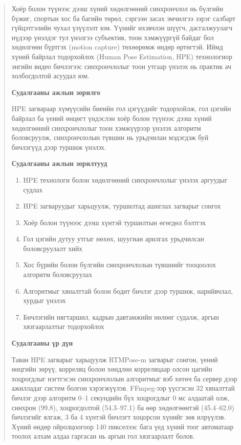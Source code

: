 \begin{abstract}
Хоёр болон түүнээс дээш хүний хөдөлгөөний синхрончлол нь бүлгийн бүжиг, спортын хос ба багийн төрөл, сэргээн засах эмчилгээ зэрэг салбарт гүйцэтгэлийн чухал үзүүлэлт юм. Үүнийг ихэвчлэн шүүгч, дасгалжуулагч нүдээр үнэлдэг тул үнэлгээ субъектив, тоон хэмжүүргүй байдаг бол хөдөлгөөн бүртгэх (motion capture) төхөөрөмж өндөр өртөгтэй. Иймд хүний байрлал тодорхойлох (Human Pose Estimation, HPE) технологиор энгийн видео бичлэгээс синхрончлолыг тоон утгаар үнэлэх нь практик ач холбогдолтой асуудал юм.

\medskip\noindent\textbf{Судалгааны ажлын зорилго}\par
HPE загвараар хүмүүсийн биеийн гол цэгүүдийг тодорхойлж, гол цэгийн байрлал ба үений өнцөгт үндэслэн хоёр болон түүнээс дээш хүний хөдөлгөөний синхрончлолыг тоон хэмжүүрээр үнэлэх алгоритм боловсруулж, синхрончлолын түвшин нь урьдчилан мэдэгдэж буй бичлэгүүд дээр туршиж үнэлэх.

\medskip\noindent\textbf{Судалгааны ажлын зорилтууд}\par
\begin{enumerate}
\def\labelenumi{\arabic{enumi}.}
\item
  HPE технологи болон хөдөлгөөний синхрончлолыг үнэлэх аргуудыг судлах
\item
  HPE загваруудыг харьцуулж, туршилтад ашиглах загварыг сонгох
\item
  Хоёр болон түүнээс дээш хүнтэй туршилтын өгөгдөл бэлтгэх
\item
  Гол цэгийн дутуу утгыг нөхөх, шуугиан арилгах урьдчилсан боловсруулалт хийх
\item
  Хос бүрийн болон бүлгийн синхрончлолын түвшнийг тооцоолох алгоритм боловсруулах
\item
  Алгоритмыг хяналттай болон бодит бичлэг дээр туршиж, нарийвчлал, хурдыг үнэлэх
\item
  Бичлэгийн нягтаршил, кадрын давтамжийн нөлөөг судалж, аргын хязгаарлалтыг тодорхойлох
\end{enumerate}

\medskip\noindent\textbf{Судалгааны үр дүн}\par
Таван HPE загварыг харьцуулж RTMPose-m загварыг сонгон, үений өнцгийн зөрүү, корреляц болон хөндлөн корреляцаар олсон цагийн хоцрогдлыг нэгтгэсэн синхрончлолын алгоритмыг вэб хөтөч ба сервер дээр ажилладаг систем болгон хэрэгжүүлэв. FFmpeg-ээр үүсгэсэн 32 хяналттай бичлэг дээр алгоритм 0--1 секундийн бүх хоцрогдлыг 0 мс алдаатай олж, синхрон (99.8), хоцрогдолтой (54.3--97.1) ба өөр хөдөлгөөнтэй (45.4--62.0) бичлэгийг ялгаж, 3 ба 4 хүнтэй бичлэгт хоцорсон хүнийг зөв илрүүлэв. Хүний өндөр ойролцоогоор 140 пикселээс бага үед хүний тоог автоматаар тоолох алхам алдаа гаргасан нь аргын гол хязгаарлалт болов.
\end{abstract}
